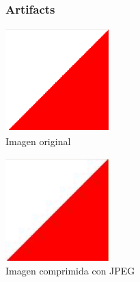 \documentclass{beamer}
\begin{document}
\begin{frame}
    \frametitle{Artifacts}
    \begin{minipage}[t]{0.4\linewidth}
        \begin{center}
            \includegraphics[width=4cm, height=4cm]{fig/borde.png}\\
            Imagen original
        \end{center}
    \end{minipage}
    \hfill
    \begin{minipage}[t]{0.4\linewidth}
        \begin{center}
        \includegraphics[width=4cm, height=4cm]{fig/borde_jpeg.png}\\
        Imagen comprimida con JPEG
        \end{center}
    \end{minipage}
\end{frame}
\end{document}
